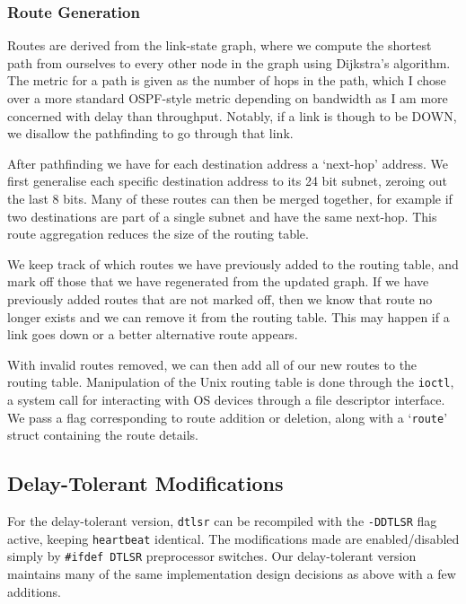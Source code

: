 \documentclass[10pt,twoside,a4paper]{article}
\begin{document}
\subsubsection{Route Generation}

Routes are derived from the link-state graph, where we compute the shortest path from ourselves to every other node in the graph using Dijkstra's algorithm. The metric for a path is given as the number of hops in the path, which I chose over a more standard OSPF-style metric depending on bandwidth as I am more concerned with delay than throughput. Notably, if a link is though to be DOWN, we disallow the pathfinding to go through that link.

After pathfinding we have for each destination address a `next-hop' address. We first generalise each specific destination address to its 24 bit subnet, zeroing out the last 8 bits. Many of these routes can then be merged together, for example if two destinations are part of a single subnet and have the same next-hop. This route aggregation reduces the size of the routing table.

We keep track of which routes we have previously added to the routing table, and mark off those that we have regenerated from the updated graph. If we have previously added routes that are not marked off, then we know that route no longer exists and we can remove it from the routing table. This may happen if a link goes down or a better alternative route appears.

With invalid routes removed, we can then add all of our new routes to the routing table. Manipulation of the Unix routing table is done through the \texttt{ioctl}, a system call for interacting with OS devices through a file descriptor interface. We pass a flag corresponding to route addition or deletion, along with a `\texttt{route}' struct containing the route details.

\subsection{Delay-Tolerant Modifications}

For the delay-tolerant version, \texttt{dtlsr} can be recompiled with the \texttt{-DDTLSR} flag active, keeping \texttt{heartbeat} identical. The modifications made are enabled/disabled simply by \texttt{\#ifdef DTLSR} preprocessor switches. Our delay-tolerant version maintains many of the same implementation design decisions as above with a few additions.
\end{document}
